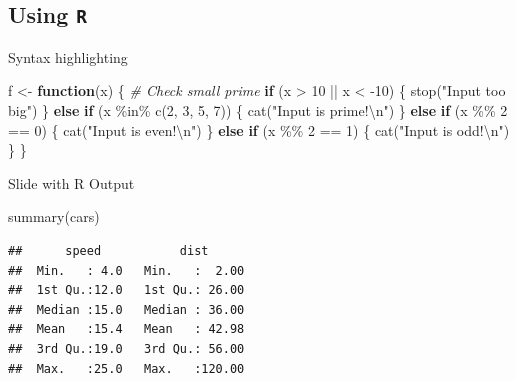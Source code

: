 \documentclass[,aspectratio=43]{beamer}
\newenvironment{Shaded}{\begin{snugshade}}{\end{snugshade}}
\newcommand{\CommentTok}[1]{\textcolor[rgb]{0.56,0.35,0.01}{\textit{#1}}}
\newcommand{\ControlFlowTok}[1]{\textcolor[rgb]{0.13,0.29,0.53}{\textbf{#1}}}
\newcommand{\DecValTok}[1]{\textcolor[rgb]{0.00,0.00,0.81}{#1}}
\newcommand{\FunctionTok}[1]{\textcolor[rgb]{0.00,0.00,0.00}{#1}}
\newcommand{\NormalTok}[1]{#1}
\newcommand{\OtherTok}[1]{\textcolor[rgb]{0.56,0.35,0.01}{#1}}
\newcommand{\SpecialCharTok}[1]{\textcolor[rgb]{0.00,0.00,0.00}{#1}}
\newcommand{\StringTok}[1]{\textcolor[rgb]{0.31,0.60,0.02}{#1}}
\begin{document}
\hypertarget{using-r}{%
\subsection{\texorpdfstring{Using \texttt{R}}{Using R}}\label{using-r}}

\begin{frame}[fragile]{Syntax highlighting}
\protect\hypertarget{syntax-highlighting}{}
\begin{Shaded}
\begin{Highlighting}[]
\NormalTok{f }\OtherTok{\textless{}{-}} \ControlFlowTok{function}\NormalTok{(x) \{}
  \CommentTok{\# Check small prime}
  \ControlFlowTok{if}\NormalTok{ (x }\SpecialCharTok{\textgreater{}} \DecValTok{10} \SpecialCharTok{||}\NormalTok{ x }\SpecialCharTok{\textless{}} \SpecialCharTok{{-}}\DecValTok{10}\NormalTok{) \{}
    \FunctionTok{stop}\NormalTok{(}\StringTok{"Input too big"}\NormalTok{)}
\NormalTok{  \} }\ControlFlowTok{else} \ControlFlowTok{if}\NormalTok{ (x }\SpecialCharTok{\%in\%} \FunctionTok{c}\NormalTok{(}\DecValTok{2}\NormalTok{, }\DecValTok{3}\NormalTok{, }\DecValTok{5}\NormalTok{, }\DecValTok{7}\NormalTok{)) \{}
    \FunctionTok{cat}\NormalTok{(}\StringTok{"Input is prime!}\SpecialCharTok{\textbackslash{}n}\StringTok{"}\NormalTok{)}
\NormalTok{  \} }\ControlFlowTok{else} \ControlFlowTok{if}\NormalTok{ (x }\SpecialCharTok{\%\%} \DecValTok{2} \SpecialCharTok{==} \DecValTok{0}\NormalTok{) \{}
    \FunctionTok{cat}\NormalTok{(}\StringTok{"Input is even!}\SpecialCharTok{\textbackslash{}n}\StringTok{"}\NormalTok{)}
\NormalTok{  \} }\ControlFlowTok{else} \ControlFlowTok{if}\NormalTok{ (x }\SpecialCharTok{\%\%} \DecValTok{2} \SpecialCharTok{==} \DecValTok{1}\NormalTok{) \{}
    \FunctionTok{cat}\NormalTok{(}\StringTok{"Input is odd!}\SpecialCharTok{\textbackslash{}n}\StringTok{"}\NormalTok{)}
\NormalTok{  \}}
\NormalTok{\}}
\end{Highlighting}
\end{Shaded}
\end{frame}

\begin{frame}[fragile]{Slide with R Output}
\protect\hypertarget{slide-with-r-output}{}
\begin{Shaded}
\begin{Highlighting}[]
\FunctionTok{summary}\NormalTok{(cars)}
\end{Highlighting}
\end{Shaded}

\begin{verbatim}
##      speed           dist       
##  Min.   : 4.0   Min.   :  2.00  
##  1st Qu.:12.0   1st Qu.: 26.00  
##  Median :15.0   Median : 36.00  
##  Mean   :15.4   Mean   : 42.98  
##  3rd Qu.:19.0   3rd Qu.: 56.00  
##  Max.   :25.0   Max.   :120.00
\end{verbatim}
\end{frame}
\end{document}

